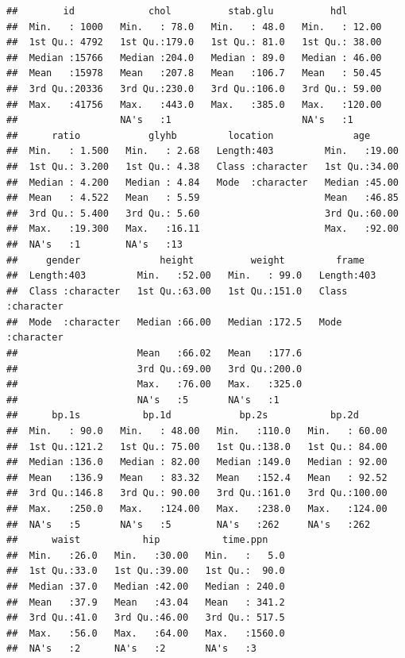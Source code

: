 \documentclass[
]{book}
\begin{document}
\begin{verbatim}
##        id             chol          stab.glu          hdl        
##  Min.   : 1000   Min.   : 78.0   Min.   : 48.0   Min.   : 12.00  
##  1st Qu.: 4792   1st Qu.:179.0   1st Qu.: 81.0   1st Qu.: 38.00  
##  Median :15766   Median :204.0   Median : 89.0   Median : 46.00  
##  Mean   :15978   Mean   :207.8   Mean   :106.7   Mean   : 50.45  
##  3rd Qu.:20336   3rd Qu.:230.0   3rd Qu.:106.0   3rd Qu.: 59.00  
##  Max.   :41756   Max.   :443.0   Max.   :385.0   Max.   :120.00  
##                  NA's   :1                       NA's   :1       
##      ratio            glyhb         location              age       
##  Min.   : 1.500   Min.   : 2.68   Length:403         Min.   :19.00  
##  1st Qu.: 3.200   1st Qu.: 4.38   Class :character   1st Qu.:34.00  
##  Median : 4.200   Median : 4.84   Mode  :character   Median :45.00  
##  Mean   : 4.522   Mean   : 5.59                      Mean   :46.85  
##  3rd Qu.: 5.400   3rd Qu.: 5.60                      3rd Qu.:60.00  
##  Max.   :19.300   Max.   :16.11                      Max.   :92.00  
##  NA's   :1        NA's   :13                                        
##     gender              height          weight         frame          
##  Length:403         Min.   :52.00   Min.   : 99.0   Length:403        
##  Class :character   1st Qu.:63.00   1st Qu.:151.0   Class :character  
##  Mode  :character   Median :66.00   Median :172.5   Mode  :character  
##                     Mean   :66.02   Mean   :177.6                     
##                     3rd Qu.:69.00   3rd Qu.:200.0                     
##                     Max.   :76.00   Max.   :325.0                     
##                     NA's   :5       NA's   :1                         
##      bp.1s           bp.1d            bp.2s           bp.2d       
##  Min.   : 90.0   Min.   : 48.00   Min.   :110.0   Min.   : 60.00  
##  1st Qu.:121.2   1st Qu.: 75.00   1st Qu.:138.0   1st Qu.: 84.00  
##  Median :136.0   Median : 82.00   Median :149.0   Median : 92.00  
##  Mean   :136.9   Mean   : 83.32   Mean   :152.4   Mean   : 92.52  
##  3rd Qu.:146.8   3rd Qu.: 90.00   3rd Qu.:161.0   3rd Qu.:100.00  
##  Max.   :250.0   Max.   :124.00   Max.   :238.0   Max.   :124.00  
##  NA's   :5       NA's   :5        NA's   :262     NA's   :262     
##      waist           hip           time.ppn     
##  Min.   :26.0   Min.   :30.00   Min.   :   5.0  
##  1st Qu.:33.0   1st Qu.:39.00   1st Qu.:  90.0  
##  Median :37.0   Median :42.00   Median : 240.0  
##  Mean   :37.9   Mean   :43.04   Mean   : 341.2  
##  3rd Qu.:41.0   3rd Qu.:46.00   3rd Qu.: 517.5  
##  Max.   :56.0   Max.   :64.00   Max.   :1560.0  
##  NA's   :2      NA's   :2       NA's   :3
\end{verbatim}
\end{document}
